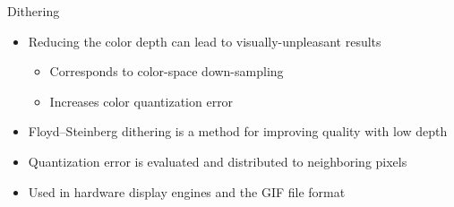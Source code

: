 \begin{frame}{Dithering}
  \begin{itemize}
  \item Reducing the color depth can lead to visually-unpleasant results
    \begin{itemize}
    \item Corresponds to color-space down-sampling
    \item Increases color quantization error
    \end{itemize}
  \item Floyd–Steinberg dithering is a method for improving quality with low depth
  \item Quantization error is evaluated and distributed to neighboring pixels
  \item Used in hardware display engines and the GIF file format
  \end{itemize}~\\


\end{frame}
